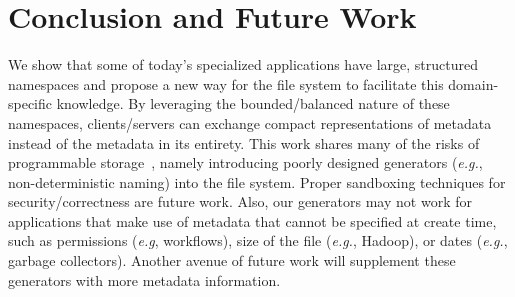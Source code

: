 \thispagestyle{empty}
\vspace{-1em}
\section{Conclusion and Future Work}
\vspace{-0.75em}

We show that some of today's specialized applications have large, structured
namespaces and propose a new way for the file system to facilitate this
domain-specific knowledge.  By leveraging the bounded/balanced nature of these
namespaces, clients/servers can exchange compact representations of metadata
instead of the metadata in its entirety.  This work shares many of the risks of
programmable storage~\cite{sevilla:eurosys17-malacology, sevilla:sc15-mantle},
namely introducing poorly designed generators ({\it e.g.}, non-deterministic
naming) into the file system.  Proper sandboxing techniques for
security/correctness are future work.  Also, our generators may not work for
applications that make use of metadata that cannot be specified at create time,
such as permissions ({\it e.g}, workflows), size of the file ({\it e.g.},
Hadoop), or dates ({\it e.g.}, garbage collectors).  Another avenue of future
work will supplement these generators with more metadata information.




